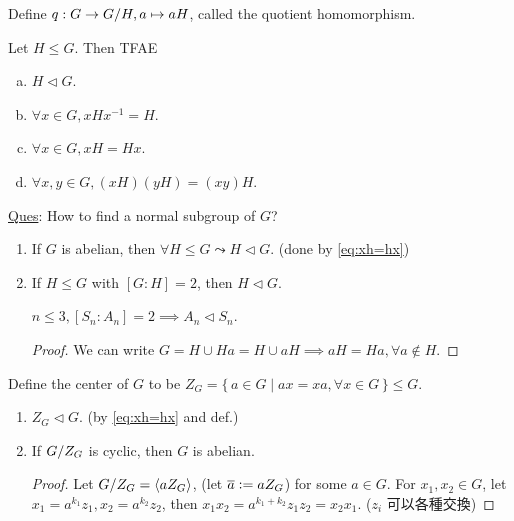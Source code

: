 \begin{remark}
  Define $q: G \to {G}/{H}, a \mapsto aH$, called the quotient homomorphism.
\end{remark}

\begin{exercise}
  Let $H \le G$. Then TFAE
  \begin{enumerate}[(a)]
    \item $H \lhd G$.
    \item $\forall x \in G, xHx^{-1} = H$.
    \item $\forall x \in G, xH = Hx$. \label{eq:xh=hx}
    \item $\forall x, y \in G, (xH)(yH) = (xy)H$.
  \end{enumerate}
\end{exercise}

\underline{Ques}: How to find a normal subgroup of $G$?

\begin{prop} \mbox{}
  \begin{enumerate}
    \item If $G$ is abelian, then $\forall H \le G \leadsto H \lhd G$.
      (done by \ref{eq:xh=hx})
    \item If $H \le G$ with $[G:H] = 2$, then $H \lhd G$.
      \begin{example}
        $n \le 3, [S_n:A_n] = 2 \implies A_n \lhd S_n$.
      \end{example}
      \begin{proof}
        We can write $G = H \cup Ha = H \cup aH \implies aH = Ha,
        \forall a \notin H$.
      \end{proof}
  \end{enumerate}
\end{prop}

\begin{definition}
  Define the center of $G$ to be $Z_G = \{\, a \in G
  \mid ax = xa, \forall x \in G \,\} \le G$.
\end{definition}

\begin{prop} \mbox{}
  \begin{enumerate}
    \item $Z_G \lhd G$. (by \ref{eq:xh=hx} and def.)
    \item If ${G}/{Z_G}$ is cyclic, then $G$ is abelian.
      \begin{proof}
        Let ${G}/{Z_G} = \langle aZ_G\rangle$, (let $\overline{a} \vcentcolon= aZ_G$) for some
        $a \in G$.
        For $x_1, x_2 \in G$, let $x_1 = a^{k_1}z_1, x_2 = a^{k_2}z_2$, then
        $x_1x_2 = a^{k_1+k_2}z_1z_2 = x_2x_1$. ($z_i$ 可以各種交換)
      \end{proof}
  \end{enumerate}
\end{prop}

